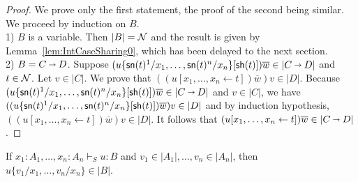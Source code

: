 \documentclass{llncs} %
\begin{document}
\begin{proof}
 We prove only the first statement, the proof of the second being similar. We proceed by induction on $B$.
\\
1) $B$ is a variable. Then $|B| = \mathcal{N}$ and the result is given by Lemma~\ref{lem:IntCaseSharing0}, which has been delayed to the next section.
\\
2) $B= C\vlim D$.
Suppose $(u\{\sn(t)^1/x_1,\dots,\sn(t)^n/x_n\}[\sh (t)])\overline{w} \in |C\vlim D|$ and $t\in\mathcal{N}$. Let $v\in|C|$. We prove that  $((u[x_1,\dots,x_n \leftarrow t])\overline{w})v \in |D|$. Because $(u\{\sn(t)^1/x_1,\dots,\sn(t)^n/x_n\}[\sh (t)])\overline{w} \in |C\vlim D|$ and $v\in|C|$, we have $((u\{{\mathsf{sn}}(t)^1/x_1,\dots,{\mathsf{sn}}(t)^n/x_n\}[{\mathsf{sh}} (t)])\overline{w})v \in |D|$ and by induction hypothesis, $((u[x_1,\dots,x_n \leftarrow t])\overline{w})v \in |D|$. It follows that $(u[x_1,\dots,x_n \leftarrow t])\overline{w} \in |C\vlim D|$.

\end{proof}

\begin{proposition}\label{prop:IntSubst}
If $x_1:A_1,\ldots, x_n:A_n \vdash_S u:B$ and $v_1 \in |A_1|, \dots, v_n \in |A_n|$, then $u\{v_1/x_1, \dots, v_n/x_n\} \in |B|$.
\end{proposition}
\end{document}
